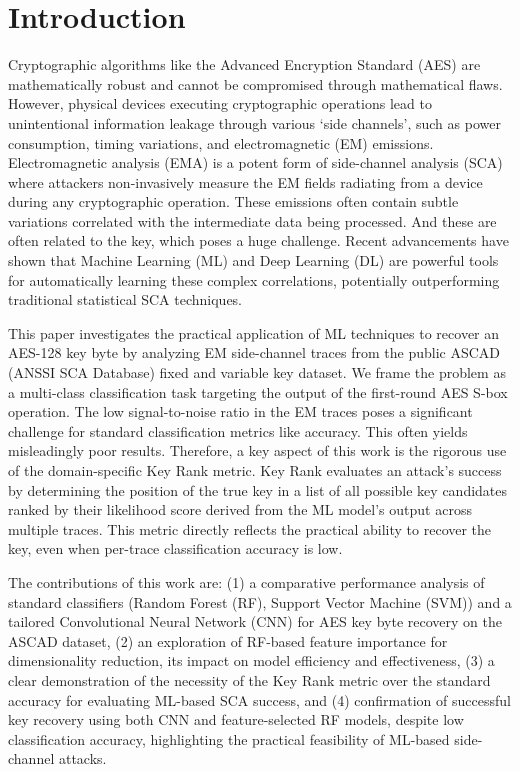 \documentclass[runningheads]{llncs}
\begin{document}

\section{Introduction}
Cryptographic algorithms like the Advanced Encryption Standard (AES) are mathematically robust and cannot be compromised through mathematical flaws. However, physical devices executing cryptographic operations lead to unintentional information leakage through various `side channels', such as power consumption, timing variations, and electromagnetic (EM) emissions.\cite{obaid2025enhancing} Electromagnetic analysis (EMA) is a potent form of side-channel analysis (SCA) where attackers non-invasively measure the EM fields radiating from a device during any cryptographic operation. These emissions often contain subtle variations correlated with the intermediate data being processed. And these are often related to the key, which poses a huge challenge. Recent advancements have shown that Machine Learning (ML) and Deep Learning (DL) are powerful tools for automatically learning these complex correlations, potentially outperforming traditional statistical SCA techniques.\cite{berreby2023investigating}\cite{kocher1999differential}

This paper investigates the practical application of ML techniques to recover an AES-128 key byte by analyzing EM side-channel traces from the public ASCAD (ANSSI SCA Database) fixed and variable key dataset\cite{benadjila2020deep}. We frame the problem as a multi-class classification task targeting the output of the first-round AES S-box operation. The low signal-to-noise ratio in the EM traces poses a significant challenge for standard classification metrics like accuracy. This often yields misleadingly poor results. Therefore, a key aspect of this work is the rigorous use of the domain-specific Key Rank metric. Key Rank evaluates an attack's success by determining the position of the true key in a list of all possible key candidates ranked by their likelihood score derived from the ML model's output across multiple traces. This metric directly reflects the practical ability to recover the key, even when per-trace classification accuracy is low.

The contributions of this work are: (1) a comparative performance analysis of standard classifiers (Random Forest (RF), Support Vector Machine (SVM)) and a tailored Convolutional Neural Network (CNN) for AES key byte recovery on the ASCAD dataset, (2) an exploration of RF-based feature importance for dimensionality reduction, its impact on model efficiency and effectiveness, (3) a clear demonstration of the necessity of the Key Rank metric over the standard accuracy for evaluating ML-based SCA success, and (4) confirmation of successful key recovery using both CNN and feature-selected RF models, despite low classification accuracy, highlighting the practical feasibility of ML-based side-channel attacks.
\end{document}
